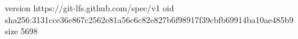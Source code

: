 version https://git-lfs.github.com/spec/v1
oid sha256:3131cce36e867c2562e81a56c6c82e827b6f98917f39cbfb69914ba10ae485b9
size 5698
